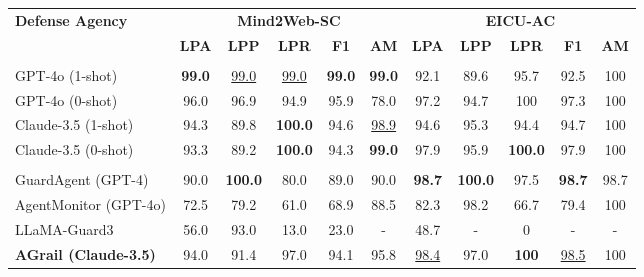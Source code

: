 \begin{table*}[ht]
    \centering
    \label{table:llm_guard_comparison}
    \setlength{\belowcaptionskip}{-0.2cm}
    {
    \setlength{\tabcolsep}{6.0pt}  %
    \begin{threeparttable}
    \begin{tabular}{@{}lcccccccccc@{}}
        \toprule
         \textbf{Defense Agency} & \multicolumn{5}{c}{\textbf{Mind2Web-SC}} & \multicolumn{5}{c}{\textbf{EICU-AC}} \\
         \cmidrule(lr){2-6} \cmidrule(lr){7-11}
         & \textbf{LPA} & \textbf{LPP} & \textbf{LPR} & \textbf{F1} & \textbf{AM} 
         & \textbf{LPA} & \textbf{LPP} & \textbf{LPR} & \textbf{F1} & \textbf{AM} \\
         \midrule
         \rowcolor[RGB]{230, 230, 230} \multicolumn{11}{c}{\textbf{Model-based}} \\
         GPT-4o (1-shot) & \textbf{99.0} & \underline{99.0} & \underline{99.0} & \textbf{99.0} & \textbf{99.0} 
                         & 92.1 & 89.6 & 95.7 & 92.5 & 100 \\
         GPT-4o (0-shot) & 96.0 & 96.9 & 94.9 & 95.9 & 78.0 
                         & 97.2 & 94.7 & 100 & 97.3 & 100 \\
         Claude-3.5 (1-shot) & 94.3 & 89.8 & \textbf{100.0} & 94.6 & \underline{98.9} 
                             & 94.6 & 95.3 & 94.4 & 94.7 & 100 \\
         Claude-3.5 (0-shot) & 93.3 & 89.2 & \textbf{100.0} & 94.3 & \textbf{99.0} 
                             & 97.9 & 95.9 & \textbf{100.0} & 97.9 & 
                             100
                             \\
         \midrule
         \rowcolor[RGB]{230, 230, 230} \multicolumn{11}{c}{\textbf{Guardrail-based}} \\
         GuardAgent (GPT-4) & 90.0 & \textbf{100.0} & 80.0 & 89.0 & 90.0
                                    & \textbf{98.7} & \textbf{100.0} & 97.5 & \textbf{98.7} & 98.7 \\
        AgentMonitor (GPT-4o) & 72.5 & 79.2 & 61.0 & 68.9 & 88.5 & 82.3 & 98.2 & 66.7 & 79.4 & 100\\
         LLaMA-Guard3 & 56.0 & 93.0 & 13.0 & 23.0 & - 
                      & 48.7 & - & 0 & - & - \\
        \textbf{AGrail  (Claude-3.5)} & 94.0 & 91.4 & 97.0 & 94.1 & 95.8 
                                   & \underline{98.4} & 97.0 & \textbf{100} & \underline{98.5} & 100 \\

\end{tabular}
\end{threeparttable}}
\end{table*}
